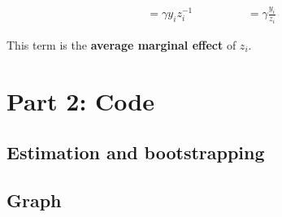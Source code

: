 \documentclass{article}
\begin{document}
\begin{align}
    = \gamma y_i z_i ^{-1} \hspace{2cm}= \gamma \frac{y_i}{z_i}
\end{align}

This term is the \textbf{average marginal effect} of $z_i$.

\section{Part 2: Code}

\subsection{Estimation and bootstrapping}

\subsection{Graph}
\end{document}
